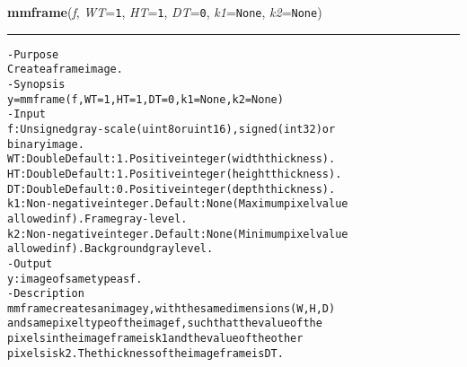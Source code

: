     \begin{boxedminipage}{\textwidth}

    \raggedright \textbf{mmframe}(\textit{f}, \textit{WT}=\texttt{1\-}, \textit{HT}=\texttt{1\-}, \textit{DT}=\texttt{0\-}, \textit{k1}=\texttt{N\-o\-n\-e\-}, \textit{k2}=\texttt{N\-o\-n\-e\-})

    \vspace{-1.5ex}

    \rule{\textwidth}{0.5\fboxrule}
\begin{alltt}
- Purpose
    Create a frame image.
- Synopsis
    y = mmframe(f, WT=1, HT=1, DT=0, k1=None, k2=None)
- Input
    f:  Unsigned gray-scale (uint8 or uint16), signed (int32) or
        binary image.
    WT: Double Default: 1. Positive integer ( width thickness).
    HT: Double Default: 1. Positive integer ( height thickness).
    DT: Double Default: 0. Positive integer ( depth thickness).
    k1: Non-negative integer. Default: None (Maximum pixel value
        allowed in f). Frame gray-level.
    k2: Non-negative integer. Default: None (Minimum pixel value
        allowed in f). Background gray level.
- Output
    y: image of same type as f .
- Description
    mmframe creates an image y , with the same dimensions (W,H,D)
    and same pixel type of the image f , such that the value of the
    pixels in the image frame is k1 and the value of the other
    pixels is k2 . The thickness of the image frame is DT.\end{alltt}

    \vspace{1ex}

    \end{boxedminipage}

    \label{multireg:num_pymorph:mmfreedom}
    \vspace{0.5ex}


